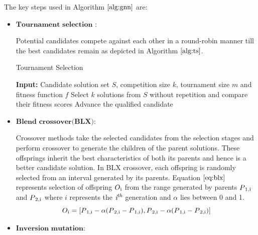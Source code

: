 \documentclass[conference]{IEEEtran}
\begin{document}
The key steps used in Algorithm $\ref{alg:gnn}$ are:
\begin{itemize}
\item $\textbf{Tournament selection }$: 

Potential candidates compete against each other in a round-robin manner till the best candidates remain as depicted in Algorithm $\ref{alg:ts}$.
\begin{algorithm}[t]
\scriptsize
\caption{Tournament Selection}
\label{alg:ts}
\begin{algorithmic}[1]
\STATE \textbf{Input:} Candidate solution set $\textit{S}$, competition size $\textit{k}$,  tournament size $\textit{m}$ and fitness function $\textit{f}$
\STATE Select $\textit{k}$ solutions from $\textit{S}$ without repetition and compare their fitness scores
\STATE Advance the qualified candidate
\ENDFOR
\end{algorithmic}
\end{algorithm}
\item 
$\textbf{Blend crossover(BLX)}$: 

Crossover methods take the selected candidates from the selection stages and perform crossover to generate the children of the parent solutions. These offsprings inherit the best characteristics of both its parents and hence is a better candidate solution. In BLX crossover, each offspring is randomly selected from an interval generated by its parents.
Equation $\ref{eq:blx}$ represents selection of offspring $O\textsubscript{i}$ from the range generated by parents $P\textsubscript{1,i}$ and $P\textsubscript{2,i}$ where $\textit{i}$ represents the $\textit{i\textsuperscript{th}}$ generation and $\alpha$ lies between 0 and 1.
\begin{equation}
\label{eq:blx}
O\textsubscript{i} = [P\textsubscript{1,i} - \alpha(P\textsubscript{2,i} - P\textsubscript{1,i}), P\textsubscript{2,i} - \alpha(P\textsubscript{1,i} - P\textsubscript{2,i})] \scriptsize 
\end{equation}
\item $\textbf{Inversion mutation}$: 


\end{itemize}
\end{document}

